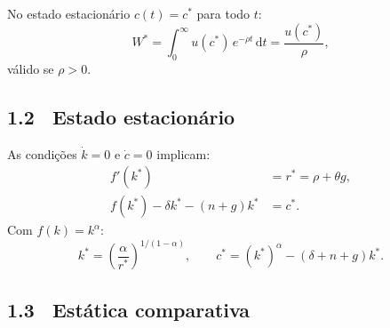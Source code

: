\documentclass[12pt, a4paper]{article}
\newcommand{\dif}{\mathrm{d}}
\newcommand{\rstar}{r^*}
\newcommand{\kstar}{k^*}
\newcommand{\cstar}{c^*}
\begin{document}
No estado estacionário $c(t) = \cstar$ para todo $t$:
\begin{equation}
W^* = \int_0^\infty u(\cstar)\,e^{-\rho t}\,\dif t = \frac{u(\cstar)}{\rho},
\label{eq:welfare_ss}
\end{equation}
válido se $\rho > 0$.

\subsection*{1.2 \ Estado estacionário}

As condições $\dot{k}=0$ e $\dot{c}=0$ implicam:
\begin{align}
f'(\kstar) &= \rstar = \rho + \theta g, \label{eq:rstar}\\
f(\kstar) - \delta \kstar - (n+g)\kstar &= \cstar. \label{eq:cstar}
\end{align}
Com $f(k)=k^\alpha$:
\[
\kstar = \left(\frac{\alpha}{\rstar}\right)^{1/(1-\alpha)}, \qquad
\cstar = (\kstar)^\alpha - (\delta+n+g)\kstar.
\]

\subsection*{1.3 \ Estática comparativa}
\end{document}
